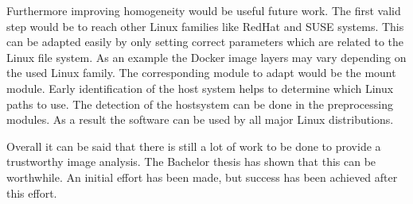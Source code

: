 Furthermore improving homogeneity would be useful future work.
The first valid step would be to reach other Linux families like RedHat and SUSE systems.
This can be adapted easily by only setting correct parameters which are related to the Linux file system.
As an example the Docker image layers may vary depending on the used Linux family.
The corresponding module to adapt would be the mount module.
Early identification of the host system helps to determine which Linux paths to use.
The detection of the hostsystem can be done in the preprocessing modules.
As a result the software can be used by all major Linux distributions.

Overall it can be said that there is still a lot of work to be done to provide a trustworthy image analysis.
The Bachelor thesis has shown that this can be worthwhile.
An initial effort has been made, but success has been achieved after this effort.
